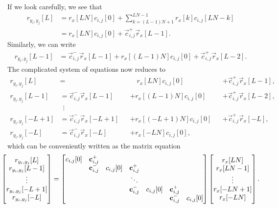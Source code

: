\documentclass[a4paper, openany, oneside]{memoir}
\begin{document}
If we look carefully, we see that
\begin{align*}
    r_{y_i,y_j}[L] &= r_x[LN]c_{i,j}[0] + \sum_{k=(L-1)N+1}^{LN-1}r_x[k]c_{i,j}[LN-k] \\
    &=r_x[LN]c_{i,j}[0] + \vec{c}_{i,j}^+ \vec{r}_x[L-1].
\end{align*}
Similarly, we can write
\begin{align*}
    r_{y_i,y_j}[L-1] &= \vec{c}_{i,j}^{-} \vec{r}_x[L-1] + r_x[(L-1)N] c_{i,j}[0] + \vec{c}_{i,j}^{+} \vec{r}_x[L-2].
\end{align*}
The complicated system of equations now reduces to
\begin{align*}
    r_{y_i,y_j}[L] &= &&\hspace{12pt}r_x[LN] c_{i,j}[0] &&+ \vec{c}_{i,j}^+ \vec{r}_x[L-1] , \\
    r_{y_i,y_j}[L-1] &= \vec{c}_{i,j}^{-} \vec{r}_x[L-1] &&+ r_x[(L-1)N] c_{i,j}[0] &&+ \vec{c}_{i,j}^{+} \vec{r}_x[L-2], \\
    &~~\vdots \\
    r_{y_i,y_j}[-L+1] &= \vec{c}_{i,j}^{-}\vec{r}_x[-L+1] &&+ r_x[(-L+1)N] c_{i,j}[0] &&+ \vec{c}_{i,j}^{+}\vec{r}_x[-L], \\
    r_{y_i,y_j}[-L] &= \vec{c}_{i,j}^{-} \vec{r}_x[-L] &&+ r_x[-LN] c_{i,j}[0],
\end{align*}
which can be conveniently written as the matrix equation
\begin{align*}\centerline{$
    \begin{bmatrix}
        r_{y_i,y_j}[L] \\
        r_{y_i,y_j}[L-1] \\
        \vdots \\
        r_{y_i,y_j}[-L+1] \\
        r_{y_i,y_j}[-L]
    \end{bmatrix} = \begin{bmatrix}
        c_{i,j}[0] & \vec{c}^+_{i,j} \\
        & \vec{c}^{-}_{i,j} & c_{i,j}[0] & \vec{c}^{+}_{i,j} \\
        &&&\ddots \\
        &&&\vec{c}^{-}_{i,j} & c_{i,j}[0] & \vec{c}^{+}_{i,j} \\
        &&&&&\vec{c}^{-}_{i,j} & c_{i,j}[0]
    \end{bmatrix} \begin{bmatrix}
        r_x[LN] \\
        r_x[LN-1] \\
        \vdots \\
        r_x[-LN+1] \\
        r_x[-LN]
    \end{bmatrix}.$}
\end{align*}
\end{document}

